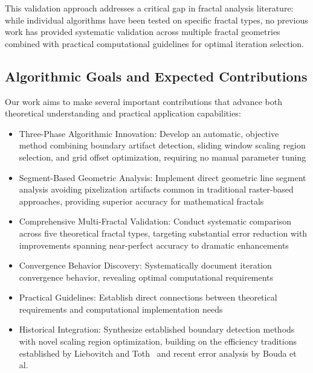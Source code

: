 \documentclass[preprint,12pt]{elsarticle}
\def\textbf#1{#1}%
\begin{document}
This validation approach addresses a critical gap in fractal analysis literature: while individual algorithms have been tested on specific fractal types, no previous work has provided systematic validation across multiple fractal geometries combined with practical computational guidelines for optimal iteration selection.

\subsection{Algorithmic Goals and Expected Contributions}

Our work aims to make several important contributions that advance both theoretical understanding and practical application capabilities:

\begin{itemize}
\item \textbf{Three-Phase Algorithmic Innovation}: Develop an automatic, objective method combining boundary artifact detection, sliding window scaling region selection, and grid offset optimization, requiring no manual parameter tuning

\item \textbf{Segment-Based Geometric Analysis}: Implement direct geometric line segment analysis avoiding pixelization artifacts common in traditional raster-based approaches, providing superior accuracy for mathematical fractals

\item \textbf{Comprehensive Multi-Fractal Validation}: Conduct systematic comparison across five theoretical fractal types, targeting substantial error reduction with improvements spanning near-perfect accuracy to dramatic enhancements

\item \textbf{Convergence Behavior Discovery}: Systematically document iteration convergence behavior, revealing optimal computational requirements

\item \textbf{Practical Guidelines}: Establish direct connections between theoretical requirements and computational implementation needs

\item \textbf{Historical Integration}: Synthesize established boundary detection methods with novel scaling region optimization, building on the efficiency traditions established by Liebovitch and Toth~\cite{liebovitch1989} and recent error analysis by Bouda et al.~\cite{bouda2016}
\end{itemize}
\end{document}
